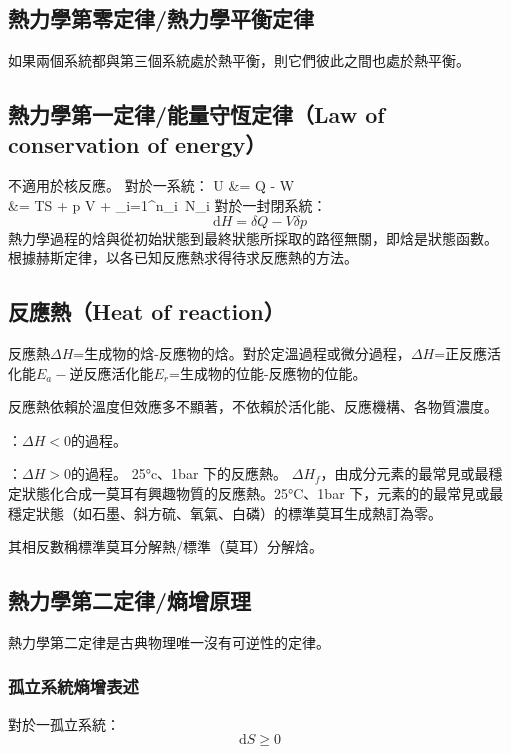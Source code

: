 \documentclass[a4paper,12pt]{report}
\begin{document}
\subsection{熱力學第零定律/熱力學平衡定律}
如果兩個系統都與第三個系統處於熱平衡，則它們彼此之間也處於熱平衡。
\subsection{熱力學第一定律/能量守恆定律（Law of conservation of energy）}
不適用於核反應。
對於一系統：
\bma
{}U &= \delta Q - \delta W\\
&= TS + p \delta V + \sum _{i=1}^{n}\mu _{i}\, N_i
\eam
{}
對於一封閉系統：
\[\mathrm{d}H = \delta Q - V\delta p \]
熱力學過程的焓與從初始狀態到最終狀態所採取的路徑無關，即焓是狀態函數。
根據赫斯定律，以各已知反應熱求得待求反應熱的方法。
\subsection{反應熱（Heat of reaction）}
反應熱$\Delta H$=生成物的焓-反應物的焓。對於定溫過程或微分過程，$\Delta H$=正反應活化能$E_a-$逆反應活化能$E_r$=生成物的位能-反應物的位能。

反應熱依賴於溫度但效應多不顯著，不依賴於活化能、反應機構、各物質濃度。

\bit
\item {}：$\Delta H<0$的過程。
\item {}：$\Delta H>0$的過程。
\eit
{}
25°c、1bar 下的反應熱。
$\Delta H_f$，由成分元素的最常見或最穩定狀態化合成一莫耳有興趣物質的反應熱。25°C、1bar 下，元素的的最常見或最穩定狀態（如石墨、斜方硫、氧氣、白磷）的標準莫耳生成熱訂為零。

其相反數稱標準莫耳分解熱/標準（莫耳）分解焓。
\subsection{熱力學第二定律/熵增原理}
熱力學第二定律是古典物理唯一沒有可逆性的定律。
\subsubsection{孤立系統熵增表述}
對於一孤立系統：
\[\mathrm{d}S \geq 0\]
\end{document}
